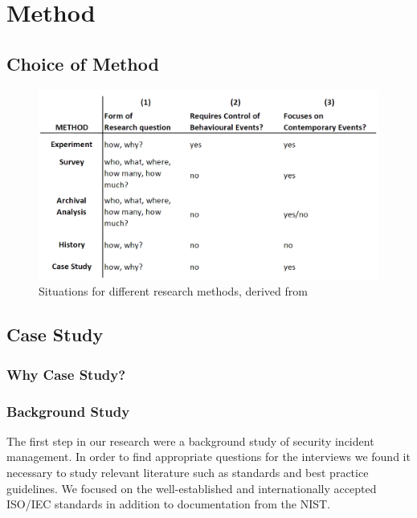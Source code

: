 \chapter{Method}
\section{Choice of Method}
\begin{figure}[h]
\begin{center}
\includegraphics[scale=0.35]{methods.png}
\caption[Situations for different research methods]{Situations for different research methods, derived from \cite{CaseStudyResearch}}
\label{fig:methods}
\end{center}
\end{figure}
\section{Case Study}
\subsection{Why Case Study?}

\subsection{Background Study}
The first step in our research were a background study of security incident management. In order to find appropriate questions for the interviews we found it necessary to study relevant literature such as standards and best practice guidelines. We focused on the well-established and internationally accepted ISO/IEC standards in addition to documentation from the \ac{NIST}.

